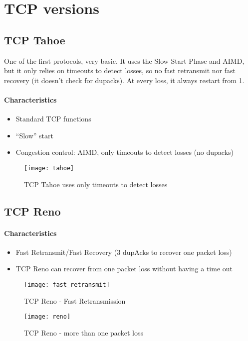 \section{TCP versions}

\subsection{TCP Tahoe}
One of the first protocols, very basic. It uses the Slow Start Phase and 
AIMD, but it only relies on timeouts to detect losses, so no fast retransmit nor 
fast recovery (it doesn't check for dupacks). At every loss, it always restart 
from 1.

\paragraph*{Characteristics}
\begin{itemize}
  \item Standard TCP functions
  \item ``Slow'' start
  \item Congestion control: AIMD, only timeouts to detect losses (no dupacks)
\end{itemize}

\begin{figure}[h]
  \texttt{[image: tahoe]}
  \caption[TCP Tahoe]{TCP Tahoe uses only timeouts to detect losses}
\end{figure}

\subsection{TCP Reno}
\paragraph*{Characteristics}
\begin{itemize}
  \item Fast Retransmit/Fast Recovery (3 dupAcks to recover one packet loss)
  \item TCP Reno can recover from one packet loss without having a time out
\end{itemize}

\begin{figure}[h]
  \texttt{[image: fast\_retransmit]}
  \caption[TCP Reno 1]{TCP Reno - Fast Retransmission}
\end{figure}

\begin{figure}[h]
  \texttt{[image: reno]}
  \caption[TCP Reno 2]{TCP Reno - more than one packet loss}
\end{figure}

